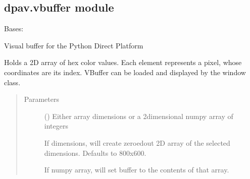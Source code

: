 \documentclass[letterpaper,10pt,english]{sphinxmanual}
\begin{document}
\subsection{dpav.vbuffer module}
\label{\detokenize{dpav:module-dpav.vbuffer}}\label{\detokenize{dpav:dpav-vbuffer-module}}

\begin{fulllineitems}
\label{\detokenize{dpav:dpav.vbuffer.VBuffer}}
\sphinxAtStartPar
Bases: 

\sphinxAtStartPar
Visual buffer for the Python Direct Platform

\sphinxAtStartPar
Holds a 2D array of hex color values. Each element represents a pixel,
whose coordinates are its index. VBuffer can be loaded and displayed by
the window class.
\begin{quote}\begin{description}
\item[{Parameters}] \leavevmode
\sphinxAtStartPar
{} (\sphinxstyleliteralemphasis{\sphinxupquote{\{}}\sphinxstyleliteralemphasis{\sphinxupquote{(}}\sphinxstyleliteralemphasis{\sphinxupquote{, }}\sphinxstyleliteralemphasis{\sphinxupquote{)}}\sphinxstyleliteralemphasis{\sphinxupquote{|}}\sphinxstyleliteralemphasis{\sphinxupquote{(}}\sphinxstyleliteralemphasis{\sphinxupquote{, }}\sphinxstyleliteralemphasis{\sphinxupquote{)}}\sphinxstyleliteralemphasis{\sphinxupquote{\}}}) \textendash{} 
\sphinxAtStartPar
Either array dimensions or a 2\sphinxhyphen{}dimensional numpy array of integers

\sphinxAtStartPar
If dimensions, will create zeroed\sphinxhyphen{}out 2D array of the selected
dimensions. Defaults to 800x600.

\sphinxAtStartPar
If numpy array, will set buffer to the contents of that array.



\end{description}
\end{quote}
\end{fulllineitems}
\end{document}

